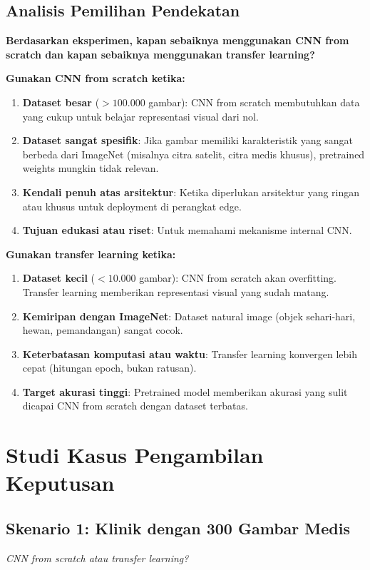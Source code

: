 \documentclass[conference]{IEEEtran}
\begin{document}
\subsection{Analisis Pemilihan Pendekatan}
\textbf{Berdasarkan eksperimen, kapan sebaiknya menggunakan CNN from scratch dan kapan sebaiknya menggunakan transfer learning?}

\textbf{Gunakan CNN from scratch ketika:}
\begin{enumerate}
	\item \textbf{Dataset besar} ($>100.000$ gambar): CNN from scratch membutuhkan data yang cukup untuk belajar representasi visual dari nol.
	\item \textbf{Dataset sangat spesifik}: Jika gambar memiliki karakteristik yang sangat berbeda dari ImageNet (misalnya citra satelit, citra medis khusus), pretrained weights mungkin tidak relevan.
	\item \textbf{Kendali penuh atas arsitektur}: Ketika diperlukan arsitektur yang ringan atau khusus untuk deployment di perangkat edge.
	\item \textbf{Tujuan edukasi atau riset}: Untuk memahami mekanisme internal CNN.
\end{enumerate}

\textbf{Gunakan transfer learning ketika:}
\begin{enumerate}
	\item \textbf{Dataset kecil} ($<10.000$ gambar): CNN from scratch akan overfitting. Transfer learning memberikan representasi visual yang sudah matang.
	\item \textbf{Kemiripan dengan ImageNet}: Dataset natural image (objek sehari-hari, hewan, pemandangan) sangat cocok.
	\item \textbf{Keterbatasan komputasi atau waktu}: Transfer learning konvergen lebih cepat (hitungan epoch, bukan ratusan).
	\item \textbf{Target akurasi tinggi}: Pretrained model memberikan akurasi yang sulit dicapai CNN from scratch dengan dataset terbatas.
\end{enumerate}

\section{Studi Kasus Pengambilan Keputusan}
\subsection{Skenario 1: Klinik dengan 300 Gambar Medis}
\textit{CNN from scratch atau transfer learning?}
\end{document}
